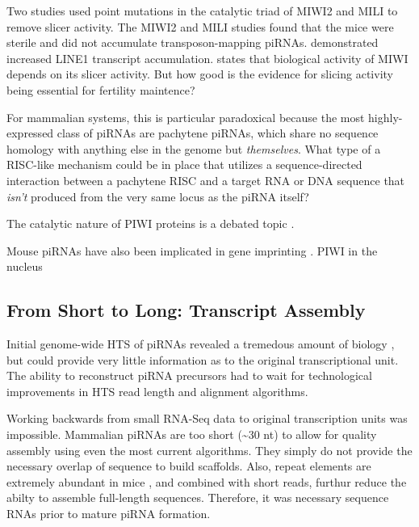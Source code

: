 
    Two studies \citep{DeFazio2011,Reuter2011} used point mutations in the catalytic triad of MIWI2 and MILI to remove slicer activity. The MIWI2 and MILI studies found that the mice were sterile and did not accumulate transposon-mapping piRNAs. \citet{DeFazio2011} demonstrated increased LINE1 transcript accumulation. \citet{Reuter2011} states that biological activity of MIWI depends on its slicer activity. But how good is the evidence for slicing activity being essential for fertility maintence?

    For mammalian systems, this is particular paradoxical because the most highly-expressed class of piRNAs are pachytene piRNAs, which share no sequence homology with anything else in the genome but \textit{themselves}. What type of a RISC-like mechanism could be in place that utilizes a sequence-directed interaction between a pachytene RISC and a target RNA or DNA sequence that \textit{isn't} produced from the very same locus as the piRNA itself?

    The catalytic nature of PIWI proteins is a debated topic \citep{Luteijn2013,Meister2013}.

    Mouse piRNAs have also been implicated in gene imprinting \citep{Watanabe2011}. 
    PIWI in the nucleus \citep{Cox2000,Aravin2008}

  \subsection{From Short to Long: Transcript Assembly}

    Initial genome-wide HTS of piRNAs revealed a tremedous amount of biology \citep{Gunawardane2007,Brennecke2007}, but could provide very little information as to the original transcriptional unit. The ability to reconstruct piRNA precursors had to wait for technological improvements in HTS read length and alignment algorithms.

    Working backwards from small RNA-Seq data to original transcription units was impossible. Mammalian piRNAs are too short (\textasciitilde30 nt) to allow for quality assembly using even the most current algorithms. They simply do not provide the necessary overlap of sequence to build scaffolds. Also, repeat elements are extremely abundant in mice \citep{Nellaker2012}, and combined with short reads, furthur reduce the abilty to assemble full-length sequences. Therefore, it was necessary sequence RNAs prior to mature piRNA formation.


